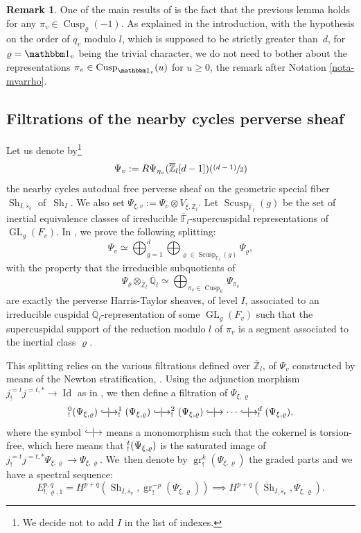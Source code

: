 \documentclass[JEP,XML,SOM,Unicode,published]{cedram}
\let\mathds\mathbbm
\newcommand{\NoChangel}[1]{%
\expandafter\let\csname old\string#1\endcsname=#1
\let#1=\relax
\newcommand{#1}{\mathcode`l="716C\csname old\string#1\endcsname\mathcode`l="7160 }%
}
\newcommand{\psfrac}[2]{\sfrac{(#1)}{#2}}
\DeclareMathOperator{\GL}{GL}
\newcommand*{\harrow}{\lhook\joinrel\relbar\joinrel\mid\joinrel\rightarrow}
\theoremstyle{plain}
\theoremstyle{definition}
\newtheorem*{remark}{Remark}
\numberwithin{equation}{subsection}
\newcommand\Fm{{\mathbb F}}
\newcommand\Qm{{\mathbb Q}}
\newcommand\Zm{{\mathbb Z}}
\DeclareMathOperator{\sh}{Sh}
\DeclareMathOperator{\cusp}{Cusp}
\DeclareMathOperator{\scusp}{Scusp}
\DeclareMathOperator{\Id}{Id}
\DeclareMathOperator{\gr}{gr}
\DeclareMathOperator{\Fil}{Fil}\NoChangel{\Fil}
\begin{document}
\begin{remark}
One of the main results of \cite[Prop.\,2.4.1]{boyer-duke} is the fact that
the previous lemma holds for any $\pi_v \in \cusp_\varrho(-1)$.
As explained in the introduction, with the hypothesis on the order of $q_v$ modulo $l$,
which is supposed to be strictly greater than~$d$, for $\varrho=\mathds 1_v$ being the trivial character,
we do not need to bother about the representations
$\pi_v \in \cusp_{\mathds 1_v}(u)$ for $u \geq 0$,
\cf the remark after Notation \ref{nota-mvarrho}.
\end{remark}

\subsection{Filtrations of the nearby cycles perverse sheaf}
\label{para-fil-psi}

Let us denote by\footnote{We decide not to add $I$ in the list of indexes.}
\[
\Psi_{v}:=R\Psi_{\eta_v}(\overline \Zm_l[d-1])(\psfrac{d-1}{2})
\]
the nearby cycles autodual free perverse sheaf on the geometric special fiber $\sh_{I,\bar s_v}$
of~$\sh_I$. We also set $\Psi_{\xi,v}:=\Psi_{v} \otimes V_{\xi,\overline \Zm_l}$.
Let $\scusp_{\overline \Fm_l}(g)$ be the set of inertial equivalence
classes of irreducible $\overline \Fm_l$-supercuspidal representations of
$\GL_g(F_v)$. In \cite[Prop.\,3.3.4]{boyer-local-ihara}, we prove the following splitting:
\begin{equation} \label{eq-psi-dec}
\Psi_{v} \simeq \bigoplus_{g=1}^d
\bigoplus_{\varrho \in \scusp_{\overline \Fm_l}(g)} \Psi_{\varrho},
\end{equation}
with the property that the irreducible subquotients of
\[
\Psi_{\varrho} \otimes_{\overline \Zm_l} \overline \Qm_l \simeq
\bigoplus_{\pi_v \in \cusp_\varrho} \Psi_{\pi_v}
\]
are exactly the perverse Harris-Taylor sheaves, of level $I$,
associated to an irreducible cuspidal $\overline \Qm_l$-representation
of some $\GL_g(F_v)$ such that the supercuspidal support of the reduction modulo $l$ of
$\pi_v$ is a segment associated to the inertial class $\varrho$.

This splitting relies on the various filtrations defined over $\overline \Zm_l$,
of $\Psi_v$ constructed by means of the Newton stratification, \cf \cite{boyer-FT}.
Using the
adjunction morphism \hbox{$j^{=t}_! j^{=t,*}\to\Id$} as in \cite{boyer-torsion}, we then define
a filtration of $\Psi_{\xi,\varrho}$
\[
\Fil^0_!(\Psi_{\xi,\varrho}) \harrow \Fil^1_!(\Psi_{\xi,\varrho}) \harrow
\Fil^{2}_!(\Psi_{\xi,\varrho})
\harrow \cdots \harrow \Fil^{d}_!(\Psi_{\xi,\varrho}),
\]
where the symbol $\harrow$ means a monomorphism such that the cokernel
is torsion-free, which here means that
$\Fil^{t}_!(\Psi_{\xi,\varrho})$ is the saturated image of
$j^{=t}_!j^{=t,*} \Psi_{\xi,\varrho} \to \Psi_{\xi,\varrho}$.
We~then denote by $\gr^k_!(\Psi_{\xi,\varrho})$ the graded parts and we have a spectral sequence:
\begin{equation} \label{eq-ss2}
E_{!,\varrho,1}^{p,q}=H^{p+q}(\sh_{I,\bar s_v},\gr^{-p}_!(\Psi_{\xi,\varrho})) \implies
H^{p+q}(\sh_{I,\bar s_v},\Psi_{\xi,\varrho}).
\end{equation}
\end{document}

